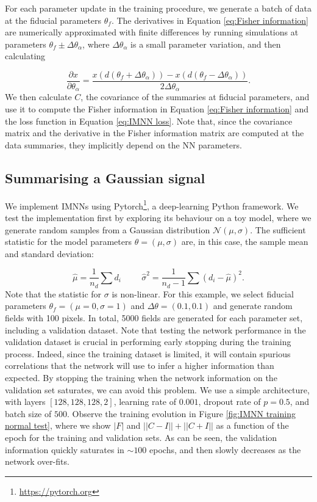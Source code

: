 For each parameter update in the training procedure, we generate a batch of data at the fiducial parameters $\theta_f$. The derivatives in Equation \ref{eq:Fisher information} are numerically approximated with finite differences by running simulations at parameters $\theta_f \pm \Delta \theta_\alpha$, where $\Delta \theta_\alpha$ is a small parameter variation, and then calculating

\begin{equation}
    \frac{\partial x}{\partial \theta_\alpha}=\frac{x(d(\theta_f + \Delta \theta_\alpha))-x(d(\theta_f - \Delta \theta_\alpha))}{2 \Delta \theta_\alpha}.
\end{equation}
We then calculate $C$, the covariance of the summaries at fiducial parameters, and use it to compute the Fisher information in Equation \ref{eq:Fisher information} and the loss function in Equation \ref{eq:IMNN loss}. Note that, since the covariance matrix and the derivative in the Fisher information matrix are computed at the data summaries, they implicitly depend on the NN parameters.

\subsection{Summarising a Gaussian signal}\label{sec:IMNN normal}
We implement IMNNs using Pytorch\footnote{\url{https://pytorch.org}}, a deep-learning Python framework. We test the implementation first by exploring its behaviour on a toy model, where we generate random samples from a Gaussian distribution $\mathcal{N}(\mu, \sigma)$. The sufficient statistic for the model parameters $\theta=(\mu,\sigma)$ are, in this case, the sample mean and standard deviation:

\begin{equation}
    \hat{\mu}=\frac{1}{n_d}\sum d_i \hspace{1cm} \hat{\sigma}^2 = \frac{1}{n_d-1}\sum (d_i -\hat{\mu})^2.
\end{equation}
Note that the statistic for $\sigma$ is non-linear.
For this example, we select fiducial parameters $\theta_f=(\mu=0, \sigma=1)$ and $\Delta \theta=(0.1 , 0.1)$ and generate random fields with 100 pixels. In total, 5000 fields are generated for each parameter set, including a validation dataset. Note that testing the network performance in the validation dataset is crucial in performing early stopping during the training process. Indeed, since the training dataset is limited, it will contain spurious correlations that the network will use to infer a higher information than expected. By stopping the training when the network information on the validation set saturates, we can avoid this problem. We use a simple architecture, with layers $[128,128,128,2]$, learning rate of $0.001$, dropout rate of $p=0.5$, and batch size of $500$. Observe the training evolution in Figure \ref{fig:IMNN training normal test}, where we show $|F|$ and $||C-I ||+||C+I||$ as a function of the epoch for the training and validation sets. As can be seen, the validation information quickly saturates in $\sim 100$ epochs, and then slowly decreases as the network over-fits.

